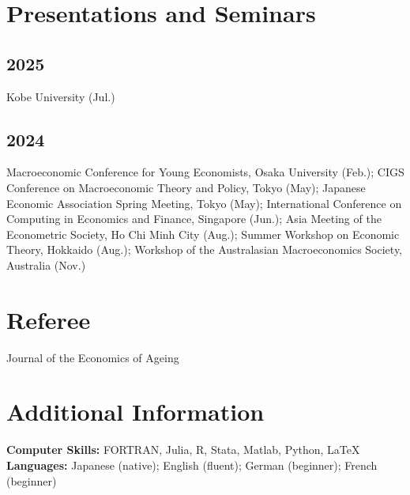 \documentclass[11pt]{article}
\begin{document}
\section*{Presentations and Seminars}
\subsection*{2025}
Kobe University (Jul.)
\subsection*{2024}
Macroeconomic Conference for Young Economists, Osaka University (Feb.); 
CIGS Conference on Macroeconomic Theory and Policy, Tokyo (May); 
Japanese Economic Association Spring Meeting, Tokyo (May); 
International Conference on Computing in Economics and Finance, Singapore (Jun.); 
Asia Meeting of the Econometric Society, Ho Chi Minh City (Aug.); 
Summer Workshop on Economic Theory, Hokkaido (Aug.); 
Workshop of the Australasian Macroeconomics Society, Australia (Nov.)

\section*{Referee}
Journal of the Economics of Ageing

\section*{Additional Information}
\textbf{Computer Skills:} FORTRAN, Julia, R, Stata, Matlab, Python, \LaTeX\newline
\textbf{Languages:} Japanese (native); English (fluent); German (beginner); French (beginner)
\end{document}

